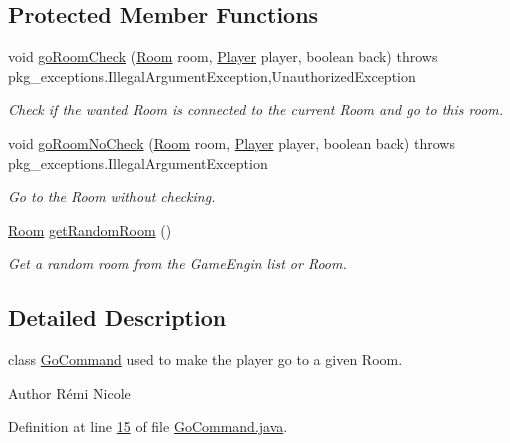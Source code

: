 \subsection*{Protected Member Functions}
\begin{DoxyCompactItemize}
\item 
void \hyperlink{classpkg__commands_1_1GoCommand_acbf1aa81fa5b1aef7cafb8b4e3ace3a9}{go\-Room\-Check} (\hyperlink{classpkg__world_1_1Room}{Room} room, \hyperlink{classpkg__world_1_1Player}{Player} player, boolean back)  throws pkg\-\_\-exceptions.\-Illegal\-Argument\-Exception,\-Unauthorized\-Exception 
\begin{DoxyCompactList}\small\item\em Check if the wanted Room is connected to the current Room and go to this room. \end{DoxyCompactList}\item 
void \hyperlink{classpkg__commands_1_1GoCommand_a210afbc5f3ef34d3ad5759d853c8f8c2}{go\-Room\-No\-Check} (\hyperlink{classpkg__world_1_1Room}{Room} room, \hyperlink{classpkg__world_1_1Player}{Player} player, boolean back)  throws pkg\-\_\-exceptions.\-Illegal\-Argument\-Exception 
\begin{DoxyCompactList}\small\item\em Go to the Room without checking. \end{DoxyCompactList}\item 
\hyperlink{classpkg__world_1_1Room}{Room} \hyperlink{classpkg__commands_1_1GoCommand_ae9ef6c18b0cbd0e0104261bdedf9a9d7}{get\-Random\-Room} ()
\begin{DoxyCompactList}\small\item\em Get a random room from the Game\-Engin list or Room. \end{DoxyCompactList}\end{DoxyCompactItemize}


\subsection{Detailed Description}
class \hyperlink{classpkg__commands_1_1GoCommand}{Go\-Command} used to make the player go to a given Room. 

\begin{DoxyAuthor}{Author}
Rémi Nicole 
\end{DoxyAuthor}


Definition at line \hyperlink{GoCommand_8java_source_l00015}{15} of file \hyperlink{GoCommand_8java_source}{Go\-Command.\-java}.



